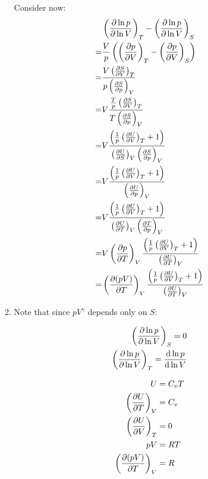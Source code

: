\documentclass[10pt,\jkfside,a4paper]{article}
\begin{document}
\begin{enumerate}
\begin{enumerate}
Consider now:
\begin{equation}
\begin{split}
 & \left(\pdv{\ln p}{\ln V}\right)_T - \left(\pdv{\ln p}{\ln V}\right)_S \\
=& \frac{V}{p}\left(\left(\pdv{p}{V}\right)_T - \left(\pdv{p}{V}\right)_S \right) \\
=& \frac{V\left(\pdv{S}{V}\right)_T}{p\left(\pdv{S}{p}\right)_V} \\
=& V\frac{\frac{T}{p}\left(\pdv{S}{V}\right)_T}{T\left(\pdv{S}{p}\right)_V} \\
=& V\frac{\left(\frac{1}{p}\left(\pdv{U}{V}\right)_T + 1\right)}{\left(\pdv{U}{S}\right)_V\left(\pdv{S}{p}\right)_V} \\
=& V\frac{\left(\frac{1}{p}\left(\pdv{U}{V}\right)_T + 1\right)}{\left(\pdv{U}{p}\right)_V} \\
=& V\frac{\left(\frac{1}{p}\left(\pdv{U}{V}\right)_T + 1\right)}{\left(\pdv{U}{T}\right)_V\left(\pdv{T}{p}\right)_V} \\
=& V\left(\pdv{p}{T}\right)_V\frac{\left(\frac{1}{p}\left(\pdv{U}{V}\right)_T + 1\right)}{\left(\pdv{U}{T}\right)_V} \\
=& \left(\pdv{(pV)}{T}\right)_V\frac{\left(\frac{1}{p}\left(\pdv{U}{V}\right)_T + 1\right)}{\left(\pdv{U}{T}\right)_V} \\
\end{split}
\end{equation}

\item 
Note that since $pV^\gamma$ depends only on $S$:

\begin{equation}
\begin{split}
\left(\pdv{\ln p}{\ln V}\right)_S = 0 \\
\left(\pdv{\ln p}{\ln V}\right)_T = \dv{\ln p}{\ln V} \\
\end{split}
\end{equation}

\begin{equation}
\begin{split}
U &= C_vT \\
\left(\pdv{U}{T}\right)_V &= C_v \\
\left(\pdv{U}{V}\right)_T &= 0 \\
pV &= RT \\
\left(\pdv{(pV)}{T}\right)_V &= R \\
\end{split}
\end{equation}


\end{enumerate}
\end{enumerate}
\end{document}
